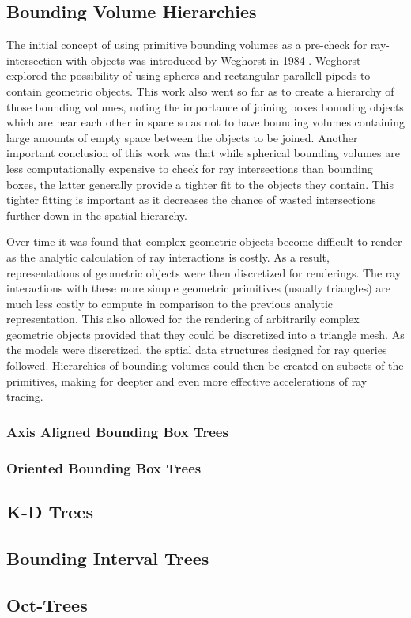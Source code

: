 \documentclass{article}
\begin{document}
\subsection{Bounding Volume Hierarchies}

The initial concept of using primitive bounding volumes as a pre-check for ray-intersection with objects was introduced by Weghorst in 1984 \cite{Weghorst:1984:ICM}. Weghorst explored the possibility of using spheres and rectangular parallell pipeds to contain geometric objects. This work also went so far as to create a hierarchy of those bounding volumes, noting the importance of joining boxes bounding objects which are near each other in space so as not to have bounding volumes containing large amounts of empty space between the objects to be joined. Another important conclusion of this work was that while spherical bounding volumes are less computationally expensive to check for ray intersections than bounding boxes, the latter generally provide a tighter fit to the objects they contain. This tighter fitting is important as it decreases the chance of wasted intersections further down in the spatial hierarchy.

Over time it was found that complex geometric objects become difficult to render as the analytic calculation of ray interactions is costly. As a result, representations of geometric objects were then discretized for renderings. The ray interactions with these more simple geometric primitives (usually triangles) are much less costly to compute in comparison to the previous analytic representation. This also allowed for the rendering of arbitrarily complex geometric objects provided that they could be discretized into a triangle mesh. As the models were discretized, the sptial data structures designed for ray queries followed. Hierarchies of bounding volumes could then be created on subsets of the primitives, making for deepter and even more effective accelerations of ray tracing.


\subsubsection{Axis Aligned Bounding Box Trees}

\subsubsection{Oriented Bounding Box Trees}

\subsection{K-D Trees}

\subsection{Bounding Interval Trees}

\subsection{Oct-Trees}



\end{document}
